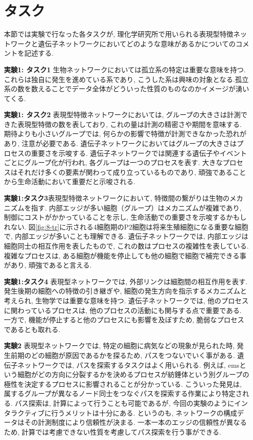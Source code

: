 \documentclass{kuee}
\begin{document}
\section{タスク}
本節では実験で行なった各タスクが, 理化学研究所で用いられる表現型特徴ネットワークと遺伝子ネットワークにおいてどのような意味があるかについてのコメントを記述する.
\begin{description}
  \item{\bf 実験1: タスク1} 生物ネットワークにおいては孤立系の特定は重要な意味を持つ.これらは独自に発生を進めている系であり, こうした系は興味の対象となる.孤立系の数を数えることでデータ全体がどういった性質のものなのかイメージが湧いてくる.
  \item{\bf 実験1: タスク2} 表現型特徴ネットワークにおいては, グループの大きさは計測できた表現型特徴の数を表しており, これの量は計測の精密さや期間を意味する.
  期待よりも小さいグループでは, 何らかの影響で特徴が計測できなかった恐れがあり, 注意が必要である.
  遺伝子ネットワークにおいてはグループの大きさはプロセスの重要さを示唆する.
  遺伝子ネットワークでは関連する遺伝子やイベントごとにグループ化が行われ, 各グループは一つのプロセスを表す.
  大きなプロセスはそれだけ多くの要素が関わって成り立っているものであり, 頑強であることから生命活動において重要だと示唆される.
  \item{\bf 実験1:タスク3}表現型特徴ネットワークにおいて, 特徴間の繋がりは生物のメカニズムを指す.
  内部エッジが多い細胞（グループ）はメカニズムが複雑であり, 制御にコストがかかっていることを示し, 生命活動での重要さを示唆するかもしれない.
  図\ref{fig:8-tr}に示される4細胞期のP2細胞は将来生殖細胞になる重要な細胞で, 内部エッジが多いことも理解できる.
  遺伝子ネットワークでは, 内部エッジは細胞同士の相互作用を表したもので, これの数はプロセスの複雑性を表している.
  複雑なプロセスは, ある細胞が機能を停止しても他の細胞で細胞で補完できる事があり, 頑強であると言える.
  \item{\bf 実験1:タスク4} 表現型ネットワークでは, 外部リンクは細胞間の相互作用を表す.
  発生後期の細胞への特徴の引き継ぎや, 細胞の発生方向を指示するメカニズムと考えられ, 生物学では重要な意味を持つ.
  遺伝子ネットワークでは, 他のプロセスに関わっているプロセスは, 他のプロセスの活動にも関与する点で重要である.
  一方で, 機能が停止すると他のプロセスにも影響を及ぼすため, 脆弱なプロセスであるとも取れる.
  \item{\bf 実験2} 表現型ネットワークでは, 特定の細胞に病気などの現象が見られた時, 発生前期のどの細胞が原因であるかを探るため, パスをつないでいく事がある.
  遺伝子ネットワークでは, パスを探索するタスクはよく用いられる.
  例えば, emsという細胞がどの方向に分裂するかを決めるプロセスが紡錘体という別グループの極性を決定するプロセスに影響されることが分かっている.
  こういった発見は, 属するグループが異なるノード同士をつなぐパスを探索する作業により特定される.
  パス探索は, 計算によって行うことも可能であるが, 今回の実験のようにインタラクティブに行うメリットは十分にある.
  というのも, ネットワークの構成データはその計測制度により信頼性が決まる.
  一本一本のエッジの信頼性が異なるため, 計算では考慮できない性質を考慮してパス探索を行う事ができる.
\end{description}
\end{document}
